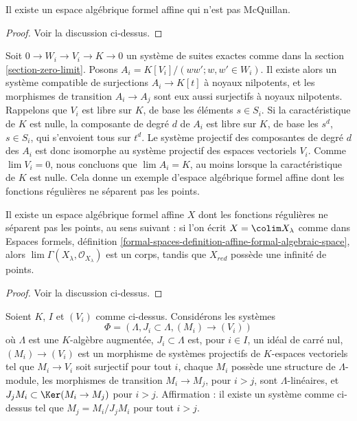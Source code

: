 \begin{lemma}
\label{lemma-affine-not-mcquillan}
Il existe un espace algébrique formel affine qui n'est pas McQuillan.
\end{lemma}

\begin{proof}
Voir la discussion ci-dessus.
\end{proof}

\noindent
Soit $0 \to W_i \to V_i \to K \to 0$ un système de suites exactes
comme dans la section \ref{section-zero-limit}. Posons
$A_i = K[V_i]/(ww'; w, w' \in W_i)$.
Il existe alors un système compatible de surjections $A_i \to K[t]$
à noyaux nilpotents, et les morphismes
de transition $A_i \to A_j$ sont eux aussi surjectifs à noyaux nilpotents.
Rappelons que $V_i$ est libre sur $K$, de base les éléments $s \in S_i$.
Si la caractéristique de $K$ est nulle, la composante de degré $d$ de
$A_i$ est libre sur $K$, de base les $s^d$, $s \in S_i$, qui s'envoient
tous sur $t^d$. Le système projectif des composantes de degré $d$ des
$A_i$ est donc isomorphe au système projectif des espaces vectoriels $V_i$.
Comme $\lim V_i = 0$, nous concluons que $\lim A_i = K$, au moins lorsque
la caractéristique de $K$ est nulle.
Cela donne un exemple d'espace algébrique formel affine
dont les fonctions régulières ne séparent pas les points.

\begin{lemma}
\label{lemma-affine-formal-functions-do-not-separate-points}
Il existe un espace algébrique formel affine $X$
dont les fonctions régulières ne séparent pas les points, au sens suivant :
si l'on écrit $X = \colim X_\lambda$ comme dans
Espaces formels, définition
\ref{formal-spaces-definition-affine-formal-algebraic-space},
alors $\lim \Gamma(X_\lambda, \mathcal{O}_{X_\lambda})$
est un corps, tandis que $X_{red}$ possède une infinité de points.
\end{lemma}

\begin{proof}
Voir la discussion ci-dessus.
\end{proof}

\noindent
Soient $K$, $I$ et $(V_i)$ comme ci-dessus. Considérons les systèmes
$$
\Phi = (\Lambda, J_i \subset \Lambda, (M_i) \to (V_i))
$$
où $\Lambda$ est une $K$-algèbre augmentée,
$J_i \subset \Lambda$ est, pour $i \in I$, un idéal de carré nul,
$(M_i) \to (V_i)$ est un morphisme de systèmes projectifs de
$K$-espaces vectoriels tel que $M_i \to V_i$ soit surjectif pour tout $i$,
chaque $M_i$ possède une structure de $\Lambda$-module, les morphismes
de transition $M_i \to M_j$, pour $i > j$, sont $\Lambda$-linéaires, et
$J_j M_i \subset \Ker(M_i \to M_j)$ pour $i > j$.
Affirmation : il existe un système comme ci-dessus tel que
$M_j = M_i/J_j M_i$ pour tout $i > j$.

